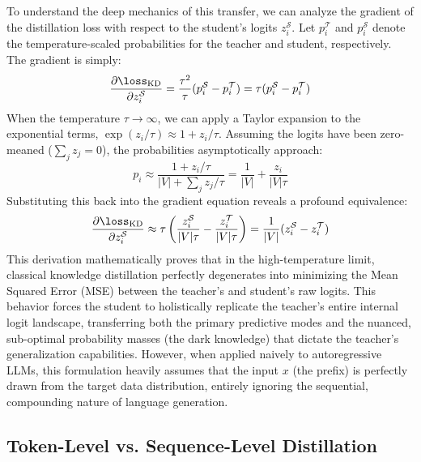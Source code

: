 To understand the deep mechanics of this transfer, we can analyze the gradient of the distillation loss with respect to the student's logits $z_i^{\mathcal{S}}$. Let $p_i^{\mathcal{T}}$ and $p_i^{\mathcal{S}}$ denote the temperature-scaled probabilities for the teacher and student, respectively. The gradient is simply:
\begin{equation}
    \frac{\partial \loss_{\mathrm{KD}}}{\partial z_i^{\mathcal{S}}} = \frac{\tau^2}{\tau} (p_i^{\mathcal{S}} - p_i^{\mathcal{T}}) = \tau (p_i^{\mathcal{S}} - p_i^{\mathcal{T}})
\end{equation}
When the temperature $\tau \to \infty$, we can apply a Taylor expansion to the exponential terms, $\exp(z_i/\tau) \approx 1 + z_i/\tau$. Assuming the logits have been zero-meaned ($\sum_j z_j = 0$), the probabilities asymptotically approach:
\begin{equation}
    p_i \approx \frac{1 + z_i/\tau}{|V| + \sum_j z_j/\tau} = \frac{1}{|V|} + \frac{z_i}{|V|\tau}
\end{equation}
Substituting this back into the gradient equation reveals a profound equivalence:
\begin{equation}
    \frac{\partial \loss_{\mathrm{KD}}}{\partial z_i^{\mathcal{S}}} \approx \tau \left( \frac{z_i^{\mathcal{S}}}{|V|\tau} - \frac{z_i^{\mathcal{T}}}{|V|\tau} \right) = \frac{1}{|V|} (z_i^{\mathcal{S}} - z_i^{\mathcal{T}})
\end{equation}
This derivation mathematically proves that in the high-temperature limit, classical knowledge distillation perfectly degenerates into minimizing the Mean Squared Error (MSE) between the teacher's and student's raw logits. This behavior forces the student to holistically replicate the teacher's entire internal logit landscape, transferring both the primary predictive modes and the nuanced, sub-optimal probability masses (the dark knowledge) that dictate the teacher's generalization capabilities. However, when applied naively to autoregressive LLMs, this formulation heavily assumes that the input $x$ (the prefix) is perfectly drawn from the target data distribution, entirely ignoring the sequential, compounding nature of language generation.

\subsection{Token-Level vs. Sequence-Level Distillation}
\label{subsec:token_vs_sequence}

